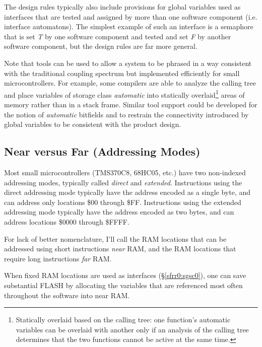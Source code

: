 \documentclass[letterpaper,10pt,titlepage]{article}
\begin{document}
The design rules typically also include provisions for global variables
used as interfaces that are tested and assigned by more than one software
component (i.e. interface automatons).  The simplest example of such an 
interface is a semaphore that is
set \emph{T} by one software component and tested and set \emph{F} by
another software component, but the design rules are far more general.

Note that tools can be used to allow a system to be phrased in a way
consistent with the traditional coupling spectrum but implemented 
efficiently for small microcontrollers.  For example, some compilers 
are able to analyze the calling tree and place variables of storage 
class \emph{automatic} into statically overlaid\footnote{Statically overlaid
based on the calling tree:  one function's automatic variables can be overlaid
with another only if an analysis of the calling tree determines that 
the two functions cannot be active at the same time.} areas of memory rather than
in a stack frame.  Similar tool support could be developed for the notion of
\emph{automatic} bitfields and to restrain the connectivity introduced
by global variables to be consistent with the product design.



\subsection{Near versus Far (Addressing Modes)}
\label{sfrr0:snvf0}

Most small microcontrollers (TMS370C8, 68HC05, etc.) have two 
non-indexed addressing modes, typically called \emph{direct} and
\emph{extended}.  Instructions using the direct addressing mode typically
have the address encoded as a single byte, and can address only locations
\$00 through \$FF\@.  Instructions using the extended addressing mode
typically have the address encoded as two bytes, and can address
locations \$0000 through \$FFFF.

For lack of better nomenclature, I'll call the RAM locations that can be addressed
using short instructions \emph{near} RAM, and the RAM locations that require
long instructions \emph{far} RAM.

When fixed RAM locations are used as interfaces (\S{}\ref{sfrr0:sgsc0}),
one can save substantial FLASH by allocating the variables that are 
referenced most often throughout the software into near RAM.
\end{document}
